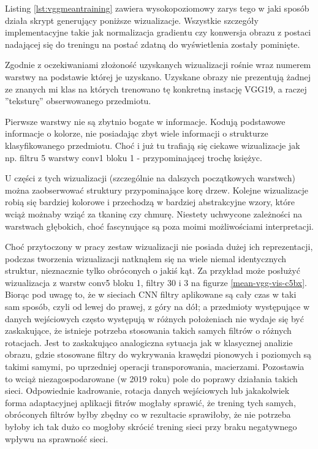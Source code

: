 Listing \ref{lst:vggmeantraining} zawiera wysokopoziomowy zarys tego w jaki sposób działa skrypt generujący poniższe wizualizacje. Wszystkie szczegóły implementacyjne takie jak normalizacja gradientu czy konwersja obrazu z postaci nadającej się do treningu na postać zdatną do wyświetlenia zostały pominięte.

Zgodnie z oczekiwaniami złożoność uzyskanych wizualizacji rośnie wraz numerem warstwy na podstawie której je uzyskano. Uzyskane obrazy nie prezentują żadnej ze znanych mi klas na których trenowano tę konkretną instację VGG19, a raczej ''teksturę'' obserwowanego przedmiotu.

Pierwsze warstwy nie są zbytnio bogate w informacje. Kodują podstawowe informacje o kolorze, nie posiadając zbyt wiele informacji o strukturze klasyfikowanego przedmiotu. Choć i już tu trafiają się ciekawe wizualizacje jak np. filtru 5 warstwy conv1 bloku 1 - przypominającej trochę księżyc. 

U części z tych wizualizacji (szczególnie na dalszych początkowych warstwch) można zaobserwować struktury przypominające korę drzew. Kolejne wizualizacje robią się bardziej kolorowe i przechodzą w bardziej abstrakcyjne wzory, które wciąż możnaby wziąć za tkaninę czy chmurę. Niestety uchwycone zależności na warstwach głębokich, choć fascynujące są poza moimi możliwościami interpretacji.

Choć przytoczony w pracy zestaw wizualizacji nie posiada dużej ich reprezentacji, podczas tworzenia wizualizacji natknąłem się na wiele niemal identycznych struktur, nieznacznie tylko obróconych o jakiś kąt. Za przykład może posłużyć wizualizacja z warstw conv5 bloku 1, filtry 30 i 3 na figurze \ref{mean-vgg-vis-c5bx}.
Biorąc pod uwagę to, że w sieciach CNN filtry aplikowane są cały czas w taki sam sposób, czyli od lewej do prawej, z góry na dół; a przedmioty występujące w danych wejściowych często występują w różnych położeniach nie wydaje się być zaskakujące, że istnieje potrzeba stosowania takich samych filtrów o różnych rotacjach. 
Jest to zaskakująco analogiczna sytuacja jak w klasycznej analizie obrazu, gdzie stosowane filtry do wykrywania krawędzi pionowych i poziomych są takimi samymi, po uprzedniej operacji transporowania, macierzami.
Pozostawia to wciąż niezagospodarowane (w 2019 roku) pole do poprawy działania takich sieci. Odpowiednie kadrowanie, rotacja danych wejściowych lub jakakolwiek forma adaptacyjnej aplikacji fitrów mogłaby sprawić, że trening tych samych, obróconych filtrów byłby zbędny co w rezultacie sprawiłoby, że nie potrzeba byłoby ich tak dużo co mogłoby skrócić trening sieci przy braku negatywnego wpływu na sprawność sieci.

